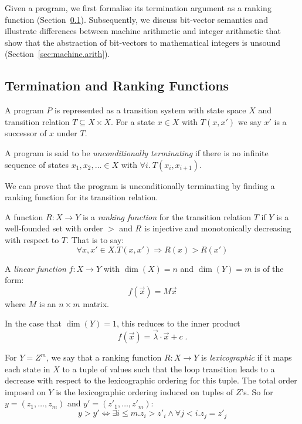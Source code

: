 \documentclass[a4paper]{llncs}
\begin{document}
Given a program, we first formalise its termination argument as a ranking
function (Section~\ref{sec:ranking.functions}).  Subsequently, we discuss
bit-vector semantics and illustrate differences between machine arithmetic
and integer arithmetic that show that the abstraction of bit-vectors to
mathematical integers is unsound (Section~\ref{sec:machine.arith}).

\subsection{Termination and Ranking Functions} \label{sec:ranking.functions}

A program $P$ is represented as a transition system with state space $X$ and
transition relation $T \subseteq X \times X$.  For a state
$x \in X$ with $T(x,x')$ we say $x'$ is a successor of $x$ under $T$.

\begin{definition}
%
A program is said to be \emph{unconditionally terminating} if
there is no infinite sequence of states $x_1, x_2, \ldots \in X$ with
$\forall i.~T(x_i, x_{i+1})$.
%
\end{definition}

We can prove that the program is unconditionally terminating by
finding a ranking function for its transition relation.
%
\begin{definition}
%
A function ${R:X\to Y}$ is a \emph{ranking function} for the
transition relation $T$ if $Y$ is a well-founded set with order $>$ and 
$R$ is injective and monotonically decreasing with respect to $T$.  That is
to say:
$$\forall x, x' \in X. T(x, x') \Rightarrow R(x) > R(x')$$
%
\end{definition}

\begin{definition}
A \emph{linear function} $f: X \to Y$ 
with $\dim(X) = n$ and $\dim(Y) = m$ is of the form: $$f(\vec{x}) = M\vec{x}$$ where
$M$ is an $n \times m$ matrix.
\end{definition}

In the case that $\dim(Y) = 1$, this reduces to the inner product
%
$$f(\vec{x}) = \vec{\lambda} \cdotp \vec{x} + c \;.$$

\begin{definition}
For $Y = Z^m$, we say that a ranking function $R: X \to Y$ is \emph{lexicographic}
if it maps each state in $X$ to a tuple of values such that the loop transition leads to a decrease with
respect to the lexicographic ordering for this tuple.
The total order imposed on $Y$ is the lexicographic ordering
induced on tuples of $Z$'s.  So for $y = (z_1, \ldots, z_m)$ and
$y' = (z'_1, \ldots, z'_m)$:
\[
 y > y' \iff \exists i \leq m . z_i > z'_i \wedge \forall j < i . z_j = z'_j
\]


\end{definition}
\end{document}
